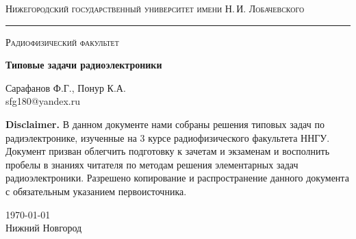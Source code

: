 \begin{titlepage}
\thispagestyle{empty}
\begin{center}
	
{\small\textsc{Нижегородский государственный университет имени Н.\,И. Лобачевского}}
\vskip 3pt \hrule \vskip 5pt
{\small\textsc{Радиофизический факультет}}

\vfill

\begin{spacing}{2}
{\Huge \bf  Типовые задачи радиоэлектроники}\\%
\end{spacing}
\vspace{1em}
{\Large Сарафанов Ф.Г., Понур К.А. }\\
{\large sfg180@yandex.ru}\\
\vspace{1em}
\end{center}

\textbf{Disclaimer.} В данном документе нами собраны решения типовых задач по радиэлектронике, изученные на 3 курсе радиофизического факультета ННГУ. Документ призван облегчить подготовку к зачетам и экзаменам и восполнить пробелы в знаниях читателя по методам решения элементарных задач радиоэлектроники. Разрешено копирование и распространение данного документа с обязательным указанием первоисточника. 
	

\begin{center}
	
\vfill
	
	 \today\\Нижний Новгород
\end{center}

\end{titlepage}

